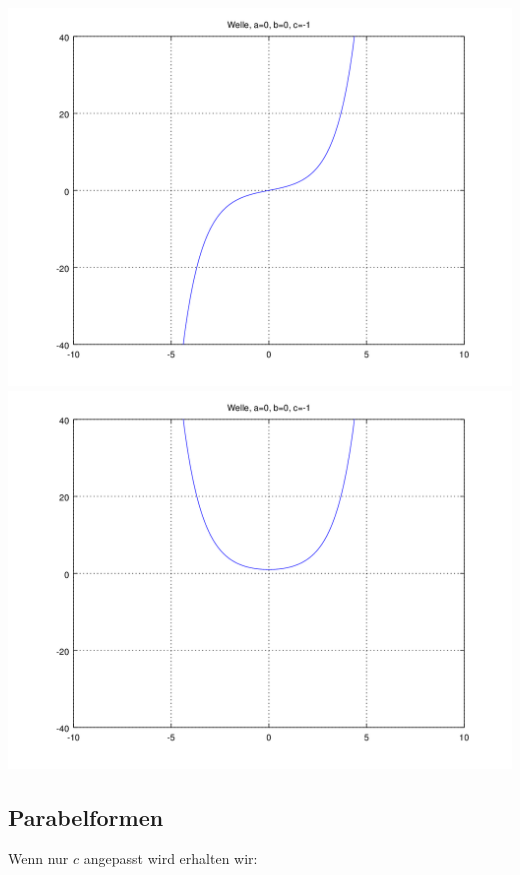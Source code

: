 \noindent
\includegraphics[scale=0.35]{./wellen/images/basicfunctions/sinh.png}
\includegraphics[scale=0.35]{./wellen/images/basicfunctions/cosh.png}

\subsection{Parabelformen}
\label{subsec:wellen:parabelformen}

Wenn nur $c$ angepasst wird erhalten wir:

